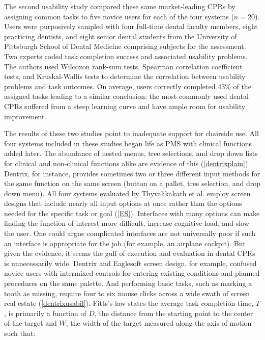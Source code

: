 \documentclass[11pt]{article}
\begin{document}
The second usability study compared\cite{Nielsen1994Enhancing-the-e} these same market-leading CPRs by assigning common tasks to five novice users for each of the four systems ($n = 20$). Users were purposively sampled with four full-time dental faculty members, eight practicing dentists, and eight senior dental students from the University of Pittsburgh School of Dental Medicine comprising subjects for the assessment. Two experts coded task completion success and associated usability problems. The authors used Wilcoxon rank-sum tests, Spearman correlation coefficient tests, and Kruskal-Wallis tests to determine the correlation between usability problems and task outcomes. On average, users correctly completed 43\% of the assigned tasks leading to a similar conclusion: the most commonly used dental CPRs suffered from a steep learning curve and have ample room for usability improvement.

The results of these two studies point to inadequate support for chairside use. All four systems included in these studies began life as PMS with clinical functions added later. The abundance of nested menus, tree selections, and drop down lists for clinical and non-clinical functions alike are evidence of this (\ref{dentrixplain}). Dentrix, for instance, provides sometimes two or three different input methods for the same function on the same screen (button on a pallet, tree selection, and drop down menu). All four systems evaluated by Thyvalikakath et al. employ screen designs that include nearly all input options at once rather than the options needed for the specific task or goal (\ref{ES}). Interfaces with many options can make finding the function of interest more difficult, increase cognitive load, and slow the user\cite{Qian2011Towards-develop}. One could argue complicated interfaces are not universally poor if such an interface is appropriate for the job (for example, an airplane cockpit). But given the evidence, it seems the gulf of execution and evaluation \cite{Norman:1989uq} in dental CPRs is unnecessarily wide. Dentrix and Eaglesoft screen design, for example, confused novice users with intermixed controls for entering existing conditions and planned procedures on the same palette. And performing basic tasks, such as marking a tooth as missing, require four to six mouse clicks across a wide swath of screen real estate (\ref{dentrixusabil}). Fitts's law \cite{Fitts:1964vn,Fitts:2012kx} states the average task completion time, $T$, is primarily a function of $D$, the distance from the starting point to the center of the target and $W$, the width of the target measured along the axis of motion such that:
\end{document}
